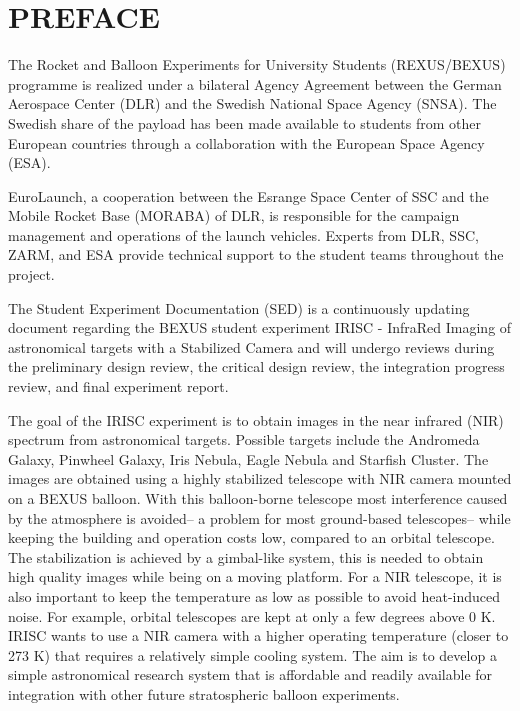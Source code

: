 \section*{PREFACE} \markboth{}{}

The Rocket and Balloon Experiments for University Students (REXUS/BEXUS) programme is realized under a bilateral Agency Agreement between the German Aerospace Center (DLR) and the Swedish National Space Agency (SNSA). The Swedish share of the
payload has been made available to students from other European countries through a collaboration with the European Space Agency (ESA).

EuroLaunch, a cooperation between the Esrange Space Center of SSC and the Mobile Rocket Base (MORABA) of DLR, is responsible for the campaign management and operations of the launch vehicles. Experts from DLR, SSC, ZARM, and ESA provide
technical support to the student teams throughout the project.

The Student Experiment Documentation (SED) is a continuously updating document regarding the BEXUS student experiment IRISC - InfraRed Imaging of astronomical targets with a Stabilized Camera and will undergo reviews during the preliminary design review, the critical design review, the integration progress review, and final experiment report.

The goal of the IRISC experiment is to obtain images in the near infrared (NIR) spectrum from astronomical targets. Possible targets include the Andromeda Galaxy, Pinwheel Galaxy, Iris Nebula, Eagle Nebula and Starfish Cluster. The images are obtained using a highly stabilized telescope with NIR camera mounted on a BEXUS balloon. With this balloon-borne telescope most interference caused by the atmosphere is avoided-- a problem for most ground-based telescopes-- while keeping the building and operation costs low, compared to an orbital telescope. The stabilization is achieved by a gimbal-like system, this is needed to obtain high quality images while being on a moving platform. For a NIR telescope, it is also important to keep the temperature as low as possible to avoid heat-induced noise. For example, orbital telescopes are kept at only a few degrees above 0 K. IRISC wants to use a NIR camera with a higher operating temperature (closer to 273 K) that requires a relatively simple cooling system. The aim is to develop a simple astronomical research system that is affordable and readily available for integration with other future stratospheric balloon experiments. 
